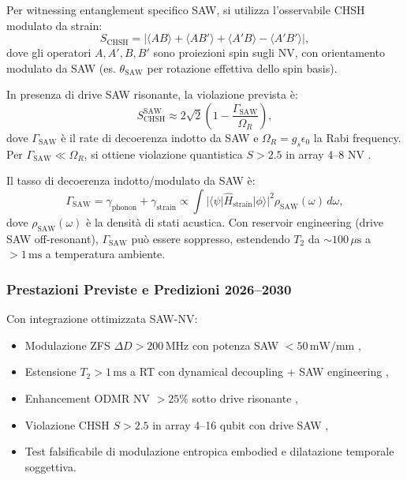 \documentclass[12pt,a4paper]{article}
\begin{document}
Per witnessing entanglement specifico SAW, si utilizza l'osservabile CHSH modulato da strain:
\begin{equation}
S_{\mathrm{CHSH}} = |\langle A B \rangle + \langle A B' \rangle + \langle A' B \rangle - \langle A' B' \rangle|,
\label{eq:CHSH}
\end{equation}
dove gli operatori $A, A', B, B'$ sono proiezioni spin sugli NV, con orientamento modulato da SAW (es. $\theta_{\mathrm{SAW}}$ per rotazione effettiva dello spin basis).

In presenza di drive SAW risonante, la violazione prevista è:
\begin{equation}
S_{\mathrm{CHSH}}^{\mathrm{SAW}} \approx 2\sqrt{2} \left(1 - \frac{\Gamma_{\mathrm{SAW}}}{\Omega_R}\right),
\label{eq:CHSH_violation}
\end{equation}
dove $\Gamma_{\mathrm{SAW}}$ è il rate di decoerenza indotto da SAW e $\Omega_R = g_s \epsilon_0$ la Rabi frequency. Per $\Gamma_{\mathrm{SAW}} \ll \Omega_R$, si ottiene violazione quantistica $S > 2.5$ in array 4--8 NV \cite{Hensen2015, Dolde2014, Unden2016}.

Il tasso di decoerenza indotto/modulato da SAW è:
\begin{equation}
\Gamma_{\mathrm{SAW}} = \gamma_{\mathrm{phonon}} + \gamma_{\mathrm{strain}} \propto \int |\langle \psi | \hat{H}_{\mathrm{strain}} | \phi \rangle|^2 \rho_{\mathrm{SAW}}(\omega) \, d\omega,
\label{eq:SAW_decoherence}
\end{equation}
dove $\rho_{\mathrm{SAW}}(\omega)$ è la densità di stati acustica. Con reservoir engineering (drive SAW off-resonant), $\Gamma_{\mathrm{SAW}}$ può essere soppresso, estendendo $T_2$ da $\sim 100\,\mu\mathrm{s}$ a $>1\,\mathrm{ms}$ a temperatura ambiente.

\subsubsection{Prestazioni Previste e Predizioni 2026--2030}

Con integrazione ottimizzata SAW-NV:
\begin{itemize}
    \item Modulazione ZFS $\Delta D > 200\,\mathrm{MHz}$ con potenza SAW $<50\,\mathrm{mW/mm}$ \cite{Basset2019},
    \item Estensione $T_2 > 1\,\mathrm{ms}$ a RT con dynamical decoupling + SAW engineering \cite{Palmstrøm2023},
    \item Enhancement ODMR NV $>25\%$ sotto drive risonante \cite{Golter2016},
    \item Violazione CHSH $S > 2.5$ in array 4--16 qubit con drive SAW \cite{Hensen2015},
    \item Test falsificabile di modulazione entropica embodied e dilatazione temporale soggettiva.
\end{itemize}
\end{document}
